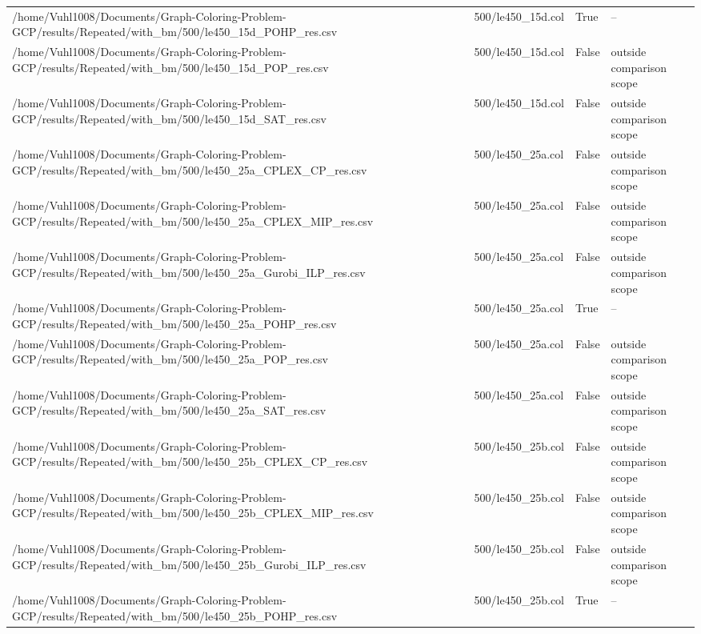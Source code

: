 \begin{table}[htbp]
\begin{tabular}{llll}
/home/Vuhl1008/Documents/Graph-Coloring-Problem-GCP/results/Repeated/with\_bm/500/le450\_15d\_POHP\_res.csv & 500/le450\_15d.col & True & -- \\
/home/Vuhl1008/Documents/Graph-Coloring-Problem-GCP/results/Repeated/with\_bm/500/le450\_15d\_POP\_res.csv & 500/le450\_15d.col & False & outside comparison scope \\
/home/Vuhl1008/Documents/Graph-Coloring-Problem-GCP/results/Repeated/with\_bm/500/le450\_15d\_SAT\_res.csv & 500/le450\_15d.col & False & outside comparison scope \\
/home/Vuhl1008/Documents/Graph-Coloring-Problem-GCP/results/Repeated/with\_bm/500/le450\_25a\_CPLEX\_CP\_res.csv & 500/le450\_25a.col & False & outside comparison scope \\
/home/Vuhl1008/Documents/Graph-Coloring-Problem-GCP/results/Repeated/with\_bm/500/le450\_25a\_CPLEX\_MIP\_res.csv & 500/le450\_25a.col & False & outside comparison scope \\
/home/Vuhl1008/Documents/Graph-Coloring-Problem-GCP/results/Repeated/with\_bm/500/le450\_25a\_Gurobi\_ILP\_res.csv & 500/le450\_25a.col & False & outside comparison scope \\
/home/Vuhl1008/Documents/Graph-Coloring-Problem-GCP/results/Repeated/with\_bm/500/le450\_25a\_POHP\_res.csv & 500/le450\_25a.col & True & -- \\
/home/Vuhl1008/Documents/Graph-Coloring-Problem-GCP/results/Repeated/with\_bm/500/le450\_25a\_POP\_res.csv & 500/le450\_25a.col & False & outside comparison scope \\
/home/Vuhl1008/Documents/Graph-Coloring-Problem-GCP/results/Repeated/with\_bm/500/le450\_25a\_SAT\_res.csv & 500/le450\_25a.col & False & outside comparison scope \\
/home/Vuhl1008/Documents/Graph-Coloring-Problem-GCP/results/Repeated/with\_bm/500/le450\_25b\_CPLEX\_CP\_res.csv & 500/le450\_25b.col & False & outside comparison scope \\
/home/Vuhl1008/Documents/Graph-Coloring-Problem-GCP/results/Repeated/with\_bm/500/le450\_25b\_CPLEX\_MIP\_res.csv & 500/le450\_25b.col & False & outside comparison scope \\
/home/Vuhl1008/Documents/Graph-Coloring-Problem-GCP/results/Repeated/with\_bm/500/le450\_25b\_Gurobi\_ILP\_res.csv & 500/le450\_25b.col & False & outside comparison scope \\
/home/Vuhl1008/Documents/Graph-Coloring-Problem-GCP/results/Repeated/with\_bm/500/le450\_25b\_POHP\_res.csv & 500/le450\_25b.col & True & -- \\

\end{tabular}
\end{table}
